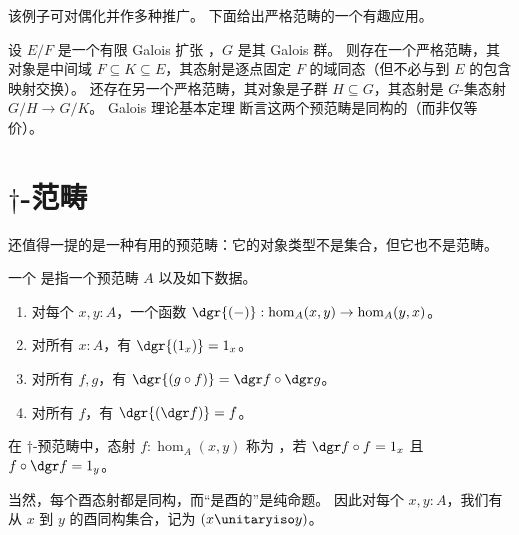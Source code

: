 该例子可对偶化并作多种推广。
下面给出严格范畴的一个有趣应用。

\begin{eg}\label{ct:galois}
  设 $E/F$ 是一个有限 Galois 扩张
  ，$G$ 是其 Galois 群。
  则存在一个严格范畴，其对象是中间域 $F\subseteq K\subseteq E$，其态射是逐点固定 $F$ 的域同态（但不必与到 $E$ 的包含映射交换）。
  还存在另一个严格范畴，其对象是子群 $H\subseteq G$，其态射是 $G$-集态射 $G/H \to G/K$。
  Galois 理论基本定理
  断言这两个预范畴是同构的（而非仅等价）。
\end{eg}

%

\section{\texorpdfstring{$\dagger$}{†}-范畴}
\label{sec:dagger-categories}

还值得一提的是一种有用的预范畴：它的对象类型不是集合，但它也不是范畴。

\begin{defn}\label{ct:dagger-precategory}
  一个
  是指一个预范畴 $A$ 以及如下数据。
  \begin{enumerate}
  \item 对每个 $x,y:A$，一个函数 $\dgr{(-)}:\hom_A(x,y) \to \hom_A(y,x)$。
  \item 对所有 $x:A$，有 $\dgr{(1_x)} = 1_x$。
  \item 对所有 $f,g$，有 $\dgr{(g\circ f)} = \dgr f \circ \dgr g$。
  \item 对所有 $f$，有 $\dgr{(\dgr f)} = f$。
  \end{enumerate}
\end{defn}

\begin{defn}\label{ct:unitary}
  在 $\dagger$-预范畴中，态射 $f:\hom_A(x,y)$ 称为
  ，若 $\dgr f \circ f = 1_x$ 且 $f\circ \dgr f = 1_y$。
\end{defn}

当然，每个酉态射都是同构，而“是酉的”是纯命题。
因此对每个 $x,y:A$，我们有从 $x$ 到 $y$ 的酉同构集合，记为 $(x\unitaryiso y)$。

